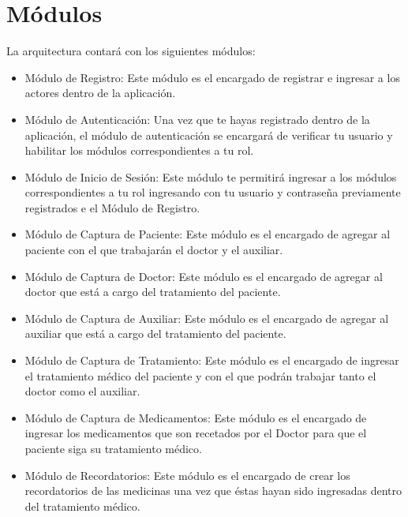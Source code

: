 \section{Módulos}
La arquitectura contará con los siguientes módulos:
\begin{itemize}
	\item Módulo de Registro: Este módulo es el encargado de registrar e ingresar a los actores dentro de la aplicación. 
	
	
	\item Módulo de Autenticación: Una vez que te hayas registrado dentro de la aplicación, el módulo de autenticación se encargará de verificar tu usuario y habilitar los módulos correspondientes a tu rol.
	
	\item Módulo de Inicio de Sesión: Este módulo te permitirá ingresar a los módulos correspondientes a tu rol ingresando con tu usuario y contraseña previamente registrados e el Módulo de Registro.
	
	 
	\item Módulo de Captura de Paciente: Este módulo es el encargado de agregar al paciente con el que trabajarán el doctor y el auxiliar.
	
	\item Módulo de Captura de Doctor: Este módulo es el encargado de agregar al doctor que está a cargo del tratamiento del paciente.
	
	\item Módulo de Captura de Auxiliar: Este módulo es el encargado de agregar al auxiliar que está a cargo del tratamiento del paciente.
	
	
	\item Módulo de Captura de Tratamiento: Este módulo es el encargado de ingresar el tratamiento médico del paciente y con el que podrán trabajar tanto el doctor como el auxiliar. 

	\item Módulo de Captura de Medicamentos: Este módulo es el encargado de ingresar los medicamentos que son recetados por el Doctor para que el paciente siga su tratamiento médico.
	
	\item Módulo de Recordatorios: Este módulo es el encargado de crear los recordatorios de las medicinas una vez que éstas hayan sido ingresadas dentro del tratamiento médico.
	

\end{itemize}
